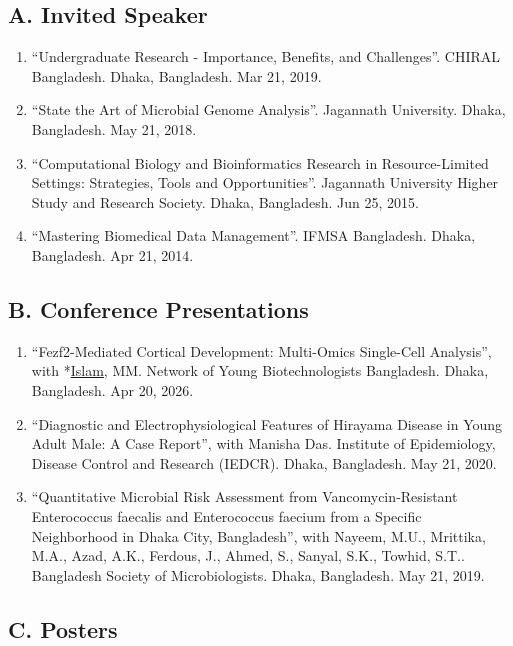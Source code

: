\documentclass[
  11pt,
  letterpaper,
  DIV=11,
  numbers=noendperiod]{scrartcl}
\providecommand{\tightlist}{%
  \setlength{\itemsep}{0pt}\setlength{\parskip}{0pt}}
\begin{document}
\subsection{A. Invited Speaker}\label{a.-invited-speaker}

\begin{enumerate}
\def\labelenumi{\arabic{enumi}.}
\tightlist
\item
  ``Undergraduate Research - Importance, Benefits, and Challenges''.
  CHIRAL Bangladesh. Dhaka, Bangladesh. Mar 21, 2019.
\item
  ``State the Art of Microbial Genome Analysis''. Jagannath University.
  Dhaka, Bangladesh. May 21, 2018.
\item
  ``Computational Biology and Bioinformatics Research in
  Resource-Limited Settings: Strategies, Tools and Opportunities''.
  Jagannath University Higher Study and Research Society. Dhaka,
  Bangladesh. Jun 25, 2015.
\item
  ``Mastering Biomedical Data Management''. IFMSA Bangladesh. Dhaka,
  Bangladesh. Apr 21, 2014.
\end{enumerate}

\subsection{B. Conference
Presentations}\label{b.-conference-presentations}

\begin{enumerate}
\def\labelenumi{\arabic{enumi}.}
\tightlist
\item
  ``Fezf2-Mediated Cortical Development: Multi-Omics Single-Cell
  Analysis'', with *\underline{Islam}, MM. Network of Young
  Biotechnologists Bangladesh. Dhaka, Bangladesh. Apr 20, 2026.
\item
  ``Diagnostic and Electrophysiological Features of Hirayama Disease in
  Young Adult Male: A Case Report'', with Manisha Das. Institute of
  Epidemiology, Disease Control and Research (IEDCR). Dhaka, Bangladesh.
  May 21, 2020.
\item
  ``Quantitative Microbial Risk Assessment from Vancomycin‑Resistant
  Enterococcus faecalis and Enterococcus faecium from a Specific
  Neighborhood in Dhaka City, Bangladesh'', with Nayeem, M.U., Mrittika,
  M.A., Azad, A.K., Ferdous, J., Ahmed, S., Sanyal, S.K., Towhid, S.T..
  Bangladesh Society of Microbiologists. Dhaka, Bangladesh. May 21,
  2019.
\end{enumerate}

\subsection{C. Posters}\label{c.-posters}
\end{document}
